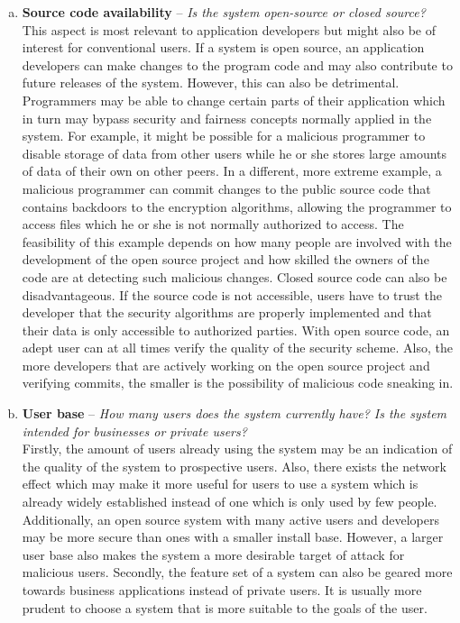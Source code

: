 \begin{enumerate}[(a)]
\item \textbf{Source code availability} -- \textit{Is the system open-source or closed source?}\\
This aspect is most relevant to application developers but might also be of interest for conventional users. If a system is open source, an application developers can make changes to the program code and may also contribute to future releases of the system. However, this can also be detrimental. Programmers may be able to change certain parts of their application which in turn may bypass security and fairness concepts normally applied in the system. For example, it might be possible for a malicious programmer to disable storage of data from other users while he or she stores large amounts of data of their own on other peers. In a different, more extreme example, a malicious programmer can commit changes to the public source code that contains backdoors to the encryption algorithms, allowing the programmer to access files which he or she is not normally authorized to access. The feasibility of this example depends on how many people are involved with the development of the open source project and how skilled the owners of the code are at detecting such malicious changes.
Closed source code can also be disadvantageous. If the source code is not accessible, users have to trust the developer that the security algorithms are properly implemented and that their data is only accessible to authorized parties. With open source code, an adept user can at all times verify the quality of the security scheme. Also, the more developers that are actively working on the open source project and verifying commits, the smaller is the possibility of malicious code sneaking in.

\item \textbf{User base} -- \textit{How many users does the system currently have? Is the system intended for businesses or private users?}\\
Firstly, the amount of users already using the system may be an indication of the quality of the system to prospective users. Also, there exists the network effect which may make it more useful for users to use a system which is already widely established instead of one which is only used by few people. Additionally, an open source system with many active users and developers may be more secure than ones with a smaller install base. However, a larger user base also makes the system a more desirable target of attack for malicious users. Secondly, the feature set of a system can also be geared more towards business applications instead of private users. It is usually more prudent to choose a system that is more suitable to the goals of the user.


\end{enumerate}
